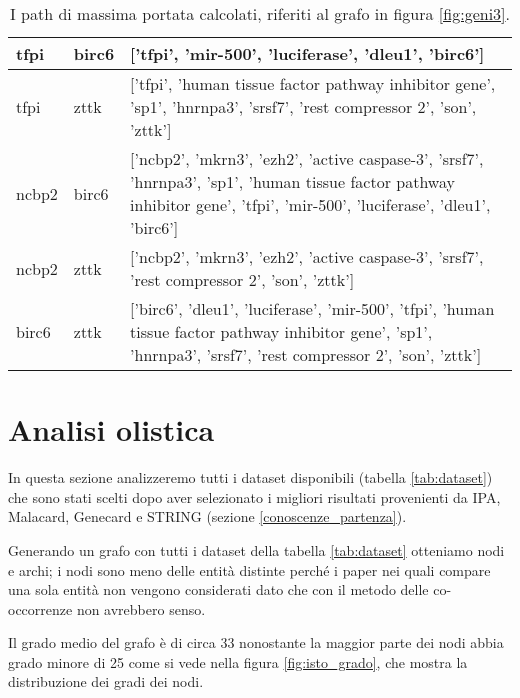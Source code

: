 \documentclass[12pt]{report}
\begin{document}
\begin{table}[!htb]
\begin{tabularx}{\textwidth}{|l|l|X|}
        \scriptsize{tfpi} & \scriptsize{birc6} & \scriptsize{ ['tfpi', 'mir-500', 'luciferase', 'dleu1', 'birc6'] } \\ \hline
        \scriptsize{tfpi} & \scriptsize{zttk} & \scriptsize{ ['tfpi', 'human tissue factor pathway inhibitor gene', 'sp1', 'hnrnpa3', 'srsf7', 'rest compressor 2', 'son', 'zttk'] } \\ \hline
        \scriptsize{ncbp2} & \scriptsize{birc6} & \scriptsize{ ['ncbp2', 'mkrn3', 'ezh2', 'active caspase-3', 'srsf7', 'hnrnpa3', 'sp1', 'human tissue factor pathway inhibitor gene', 'tfpi', 'mir-500', 'luciferase', 'dleu1', 'birc6'] } \\ \hline
        \scriptsize{ncbp2} & \scriptsize{zttk} & \scriptsize{ ['ncbp2', 'mkrn3', 'ezh2', 'active caspase-3', 'srsf7', 'rest compressor 2', 'son', 'zttk'] } \\ \hline
        \scriptsize{birc6} & \scriptsize{zttk} & \scriptsize{ ['birc6', 'dleu1', 'luciferase', 'mir-500', 'tfpi', 'human tissue factor pathway inhibitor gene', 'sp1', 'hnrnpa3', 'srsf7', 'rest compressor 2', 'son', 'zttk'] } \\
        \hline
    \end{tabularx}
\caption{\footnotesize{I path di massima portata calcolati, riferiti al grafo in figura \ref{fig:geni3}.}}
\label{tab:WP_geni}
\end{table}


\FloatBarrier
\section{Analisi olistica}
In questa sezione analizzeremo tutti i dataset disponibili (tabella \ref{tab:dataset}) che sono stati scelti dopo aver selezionato i migliori risultati provenienti da IPA, Malacard, Genecard e STRING (sezione \ref{conoscenze_partenza}).

Generando un grafo con tutti i dataset della tabella \ref{tab:dataset} otteniamo  nodi e  archi; i nodi sono meno delle entità distinte perché i paper nei quali compare una sola entità non vengono considerati dato che con il metodo delle co-occorrenze non avrebbero senso.

Il grado medio del grafo è di circa 33 nonostante la maggior parte dei nodi abbia grado minore di 25 come si vede nella figura \ref{fig:isto_grado}, che mostra la distribuzione dei gradi dei nodi.
\end{document}
